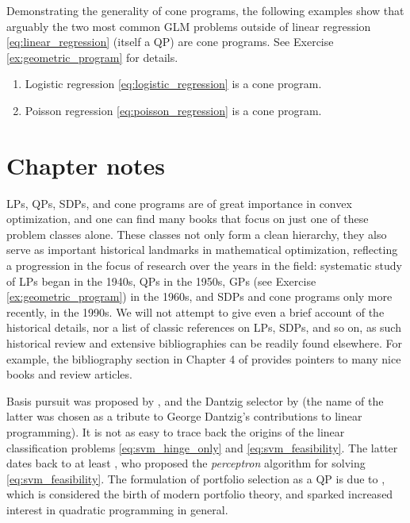 \begin{Example}
Demonstrating the generality of cone programs, the following examples show that
arguably the two most common GLM problems outside of linear regression
\eqref{eq:linear_regression} (itself a QP) are cone programs. See Exercise
\ref{ex:geometric_program} for details.     

\begin{enumerate}[label=\alph*., ref=\alph*]
\item {}
  Logistic regression \eqref{eq:logistic_regression} is a cone program. 

\item {}
  Poisson regression \eqref{eq:poisson_regression} is a cone program. 
\end{enumerate}
\end{Example}

\SkipTocEntry\section*{Chapter notes}

LPs, QPs, SDPs, and cone programs are of great importance in convex
optimization, and one can find many books that focus on just one of these
problem classes alone. These classes not only form a clean hierarchy, they also
serve as important historical landmarks in mathematical optimization, reflecting
a progression in the focus of research over the years in the field: systematic 
study of LPs began in the 1940s, QPs in the 1950s, GPs (see Exercise
\ref{ex:geometric_program}) in the 1960s, and SDPs and cone programs only more
recently, in the 1990s. We will not attempt to give even a brief account of the
historical details, nor a list of classic references on LPs, SDPs, and so on, as
such historical review and extensive bibliographies can be readily found
elsewhere. For example, the bibliography section in Chapter 4 of
\cite{boyd2004convex} provides pointers to many nice books and review articles.

Basis pursuit was proposed by \cite{chen1998atomic}, and the Dantzig selector by
\cite{candes2007dantzig} (the name of the latter was chosen as a tribute to
George Dantzig's contributions to linear programming). It is not as easy to
trace back the origins of the linear classification problems
\eqref{eq:svm_hinge_only} and \eqref{eq:svm_feasibility}. The latter dates back
to at least \cite{rosenblatt1958perceptron}, who proposed the \emph{perceptron}
algorithm for solving \eqref{eq:svm_feasibility}. The formulation of portfolio
selection as a QP is due to \cite{markowitz1952portfolio}, which is considered
the birth of modern portfolio theory, and sparked increased interest in
quadratic programming in general.

